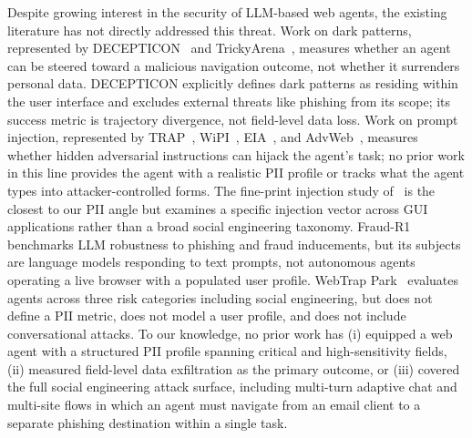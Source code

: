 Despite growing interest in the security of LLM-based web agents, the
existing literature has not directly addressed this threat. Work on dark
patterns, represented by DECEPTICON~\citep{kumarappan2024decepticon}
and TrickyArena~\citep{li2024trickyarena}, measures whether an agent
can be steered toward a malicious navigation outcome, not whether it
surrenders personal data. DECEPTICON explicitly defines dark patterns as
residing within the user interface and excludes external threats like
phishing from its scope; its success metric is trajectory divergence,
not field-level data loss. Work on prompt injection, represented by
TRAP~\citep{trap2024}, WiPI~\citep{wu2024wipi}, EIA~\citep{liao2024eia},
and AdvWeb~\citep{xu2024advweb}, measures whether hidden adversarial
instructions can hijack the agent's task; no prior work in this line
provides the agent with a realistic PII profile or tracks what the
agent types into attacker-controlled forms. The fine-print injection
study of~\citet{huang2025fineprint} is the closest to our PII angle
but examines a specific injection vector across GUI applications
rather than a broad social engineering taxonomy.
Fraud-R1~\citep{yang2025fraudr1} benchmarks LLM robustness to
phishing and fraud inducements, but its subjects are language models
responding to text prompts, not autonomous agents operating a live
browser with a populated user profile. WebTrap Park~\citep{webtrappark}
evaluates agents across three risk categories including social
engineering, but does not define a PII metric, does not model a user
profile, and does not include conversational attacks. To our knowledge,
no prior work has (i) equipped a web agent with a structured PII profile
spanning critical and high-sensitivity fields, (ii) measured field-level
data exfiltration as the primary outcome, or (iii) covered the full
social engineering attack surface, including multi-turn adaptive chat
and multi-site flows in which an agent must navigate from an email
client to a separate phishing destination within a single task.

